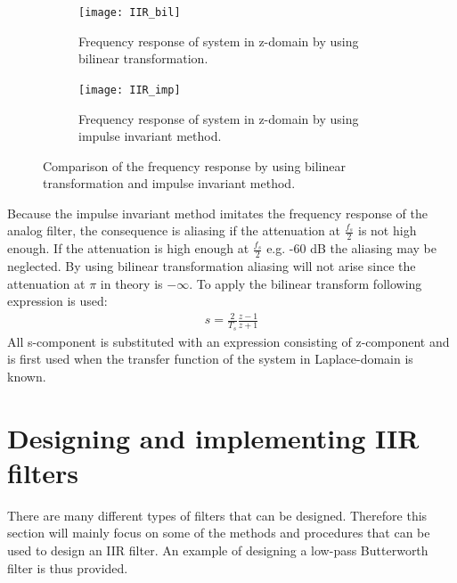 \begin{figure}[H]
\centering
\begin{subfigure}[t]{0.435\textwidth}
\texttt{[image: IIR\_bil]}
	\caption{Frequency response of system in z-domain by using bilinear transformation.}
	\label{fig:IIR_bil}
\end{subfigure}
\hspace{6mm} 
\begin{subfigure}[t]{0.47\textwidth}
\texttt{[image: IIR\_imp]}
	\caption{Frequency response of system in z-domain by using impulse invariant method.}
	\label{fig:IIR_imp}
\end{subfigure}
\caption{Comparison of the frequency response by using bilinear transformation and impulse invariant method.}
\label{fig:IIR_transforms}
\end{figure}

Because the impulse invariant method imitates the frequency response of the analog filter, the consequence is aliasing if the attenuation at $\frac{f_s}{2}$ is not high enough. If the attenuation is high enough at $\frac{f_s}{2}$ e.g. -60 dB the aliasing may be neglected. By using bilinear transformation aliasing will not arise since the attenuation at $\pi$ in theory is $-\infty$. To apply the bilinear transform following expression is used:
\begin{align}
s = \frac{2}{T_s}\frac{z-1}{z+1}
\label{eq:bilinear_trans2}
\end{align}
All s-component is substituted with an expression consisting of z-component and is first used when the transfer function of the system in Laplace-domain is known. 

\section{Designing and implementing IIR filters}
There are many different types of filters that can be designed. Therefore this section will mainly focus on some of the methods and procedures that can be used to design an IIR filter. An example of designing a low-pass Butterworth filter is thus provided.

